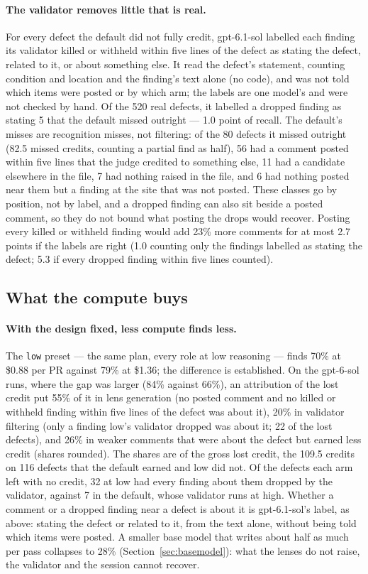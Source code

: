 \documentclass[11pt,a4paper]{article}
\newcommand{\code}[1]{\texttt{#1}}
\begin{document}
\paragraph{The validator removes little that is real.} For every defect the
default did not fully credit, gpt-6.1-sol labelled each finding its validator
killed or withheld within five lines of the defect as stating the defect,
related to it, or about something else. It read the defect's statement,
counting condition and location and the finding's text alone (no code), and
was not told which items were posted or by which arm; the labels are one
model's and were not checked by hand. Of the 520 real defects, it labelled
a dropped finding as stating 5 that the default missed outright --- 1.0
point of recall. The default's misses are recognition misses, not
filtering: of the 80 defects it missed outright (82.5 missed credits,
counting a partial find as half), 56 had a comment posted within five
lines that the judge credited to something else, 11 had a candidate
elsewhere in the file, 7 had nothing raised in the file, and 6 had nothing
posted near them but a finding at the site that was not posted. These
classes go by position, not by label, and a dropped finding can also sit
beside a posted comment, so they do not bound what posting the drops would
recover. Posting every killed or withheld finding would add 23\% more
comments for at most 2.7 points if the labels are right (1.0 counting only
the findings labelled as stating the defect; 5.3 if every dropped finding
within five lines counted).

\subsection{What the compute buys}

\paragraph{With the design fixed, less compute finds less.} The \code{low}
preset --- the same plan, every role at low reasoning --- finds 70\% at
\$0.88 per PR against 79\% at \$1.36; the difference is established. On the
gpt-6-sol runs, where the gap was larger (84\% against 66\%), an attribution
of the lost credit put 55\% of it in lens generation (no posted comment and
no killed or withheld finding within five lines of the defect was about it),
20\% in validator filtering (only a finding low's validator dropped was
about it; 22 of the lost defects), and 26\% in weaker comments that were
about the defect but earned less credit (shares rounded). The shares are of
the gross lost credit, the 109.5 credits on
116 defects that the default earned and low did not. Of the defects each
arm left with no credit, 32 at low had every finding about them dropped by
the validator, against 7 in the default, whose validator runs at high. Whether a
comment or a dropped finding near a defect is about it is gpt-6.1-sol's
label, as above: stating the defect or related to it, from the text alone,
without being told which items were posted. A
smaller base model that writes about half as much per pass collapses to
28\% (Section~\ref{sec:basemodel}): what the lenses do not raise, the
validator and the session cannot recover.
\end{document}
